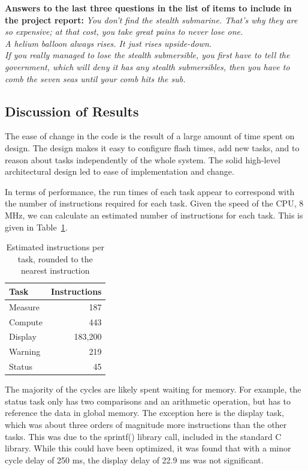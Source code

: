 \documentclass[12pt]{article} %
\begin{document}
    \textbf{Answers to the last three questions in the list of items to include
    in the project report:}
    \emph{You don't find the stealth submarine. That's why they are so expensive; at that cost, you take great pains to never lose one.\\  A helium balloon always rises. It just rises upside-down. \\ If you really managed to lose the stealth submersible, you first have to tell the government, which will deny it has any stealth submersibles, then you have to comb the seven seas until your comb hits the sub.}

    \subsection{Discussion of Results}
    The ease of change in the code is the result of a large amount of time spent on
    design. The design makes it easy to configure flash times, add new tasks, and
    to reason about tasks independently of the whole system. The solid high-level
    architectural design led to ease of implementation and change.

    In terms of performance, the run times of each task appear to correspond with
    the number of instructions required for each task. Given the speed of the CPU,
    8 MHz, we can calculate an estimated number of instructions for each task.
    This is given in Table~\ref{tab:instr}.
    \begin{table}[h]
      \centering
      \begin{tabular}{|l|r|} 
	\hline
	Task & Instructions \\ \hline
	Measure & 187 \\ \hline
	Compute & 443 \\ \hline
	Display & 183,200 \\ \hline
	Warning & 219 \\ \hline
	Status & 45 \\ \hline
      \end{tabular}
      \caption{Estimated instructions per task, rounded to the nearest instruction}
      \label{tab:instr}
    \end{table}
    The majority of the cycles are likely spent waiting for memory. For example,
    the status task only has two comparisons and an arithmetic operation, but has
    to reference the data in global memory. The exception here is the display
    task, which was about three orders of magnitude more instructions than the
    other tasks. This was due to the sprintf() library call, included in the
    standard C library. While this could have been optimized, it was found that
    with a minor cycle delay of 250 ms, the display delay of 22.9 ms was not
    significant.
\end{document}
